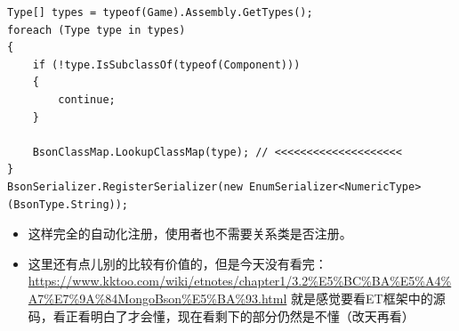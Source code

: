 \documentclass[9pt, b5paper]{article}
\begin{document}
\begin{verbatim}
Type[] types = typeof(Game).Assembly.GetTypes();
foreach (Type type in types)
{
    if (!type.IsSubclassOf(typeof(Component)))
    {
        continue;
    }

    BsonClassMap.LookupClassMap(type); // <<<<<<<<<<<<<<<<<<<< 
}
BsonSerializer.RegisterSerializer(new EnumSerializer<NumericType>(BsonType.String));
\end{verbatim}
\begin{itemize}
\item 这样完全的自动化注册，使用者也不需要关系类是否注册。
\item 这里还有点儿别的比较有价值的，但是今天没有看完：\url{https://www.kktoo.com/wiki/etnotes/chapter1/3.2\%E5\%BC\%BA\%E5\%A4\%A7\%E7\%9A\%84MongoBson\%E5\%BA\%93.html}  就是感觉要看ET框架中的源码，看正看明白了才会懂，现在看剩下的部分仍然是不懂（改天再看）
\end{itemize}
\end{document}

